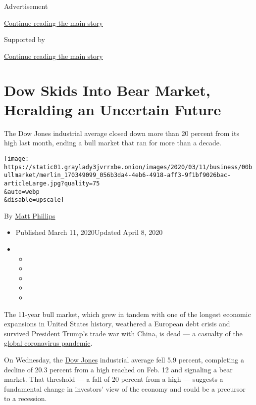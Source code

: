 Advertisement

\protect\hyperlink{after-top}{Continue reading the main story}

Supported by

\protect\hyperlink{after-sponsor}{Continue reading the main story}

\hypertarget{dow-skids-into-bear-market-heralding-an-uncertain-future}{%
\section{Dow Skids Into Bear Market, Heralding an Uncertain
Future}\label{dow-skids-into-bear-market-heralding-an-uncertain-future}}

The Dow Jones industrial average closed down more than 20 percent from
its high last month, ending a bull market that ran for more than a
decade.

\texttt{[image: https://static01.graylady3jvrrxbe.onion/images/2020/03/11/business/00bullmarket/merlin\_170349099\_056b3da4-4eb6-4918-aff3-9f1bf9026bac-articleLarge.jpg?quality=75\\\&auto=webp\\\&disable=upscale]}

By \href{https://www.nytimes3xbfgragh.onion/by/matt-phillips}{Matt
Phillips}

\begin{itemize}
\item
  Published March 11, 2020Updated April 8, 2020
\item
  \begin{itemize}
  \item
  \item
  \item
  \item
  \item
  \end{itemize}
\end{itemize}

The 11-year bull market, which grew in tandem with one of the longest
economic expansions in United States history, weathered a European debt
crisis and survived President Trump's trade war with China, is dead ---
a casualty of the
\href{https://www.nytimes3xbfgragh.onion/2020/03/11/world/coronavirus-news.html}{global
coronavirus pandemic}.

On Wednesday, the
\href{https://www.nytimes3xbfgragh.onion/2020/04/08/business/media/dow-jones-wall-street-journal-william-lewis.html}{Dow
Jones} industrial average fell 5.9 percent, completing a decline of 20.3
percent from a high reached on Feb. 12 and signaling a bear market. That
threshold --- a fall of 20 percent from a high --- suggests a
fundamental change in investors' view of the economy and could be a
precursor to a recession.

